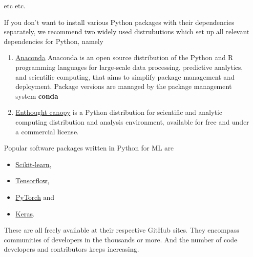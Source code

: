 \documentclass[%
oneside,                 %
final,                   %
10pt]{article}
\begin{document}
\noindent
etc etc. 

If you don't want to install various Python packages with their dependencies separately, we recommend two widely used distrubutions which set up  all relevant dependencies for Python, namely
\begin{enumerate}
\item \href{{https://docs.anaconda.com/}}{Anaconda} Anaconda is an open source distribution of the Python and R programming languages for large-scale data processing, predictive analytics, and scientific computing, that aims to simplify package management and deployment. Package versions are managed by the package management system \textbf{conda}

\item \href{{https://www.enthought.com/product/canopy/}}{Enthought canopy}  is a Python distribution for scientific and analytic computing distribution and analysis environment, available for free and under a commercial license.
\end{enumerate}

\noindent
Popular software packages written in Python for ML are

\begin{itemize}
\item \href{{http://scikit-learn.org/stable/}}{Scikit-learn}, 

\item \href{{https://www.tensorflow.org/}}{Tensorflow},

\item \href{{http://pytorch.org/}}{PyTorch} and 

\item \href{{https://keras.io/}}{Keras}.
\end{itemize}

\noindent
These are all freely available at their respective GitHub sites. They 
encompass communities of developers in the thousands or more. And the number
of code developers and contributors keeps increasing.














\end{document}
